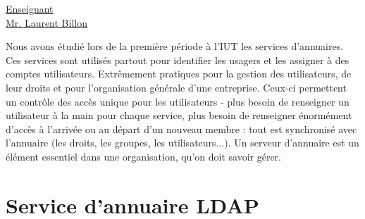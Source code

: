 \renewcommand{\figurename}{}

\vspace*{0.2cm}%
      \large
      \href{\@orientadorPagina}{\color{black}Enseignant\\Mr. Laurent Billon}\\%
\vspace*{0.5cm}%

Nous avons étudié lors de la première période à l'IUT les services d'annuaires. Ces services sont utilisés partout pour identifier les usagers et les assigner à des comptes utilisateurs. Extrêmement pratiques pour la gestion des utilisateurs, de leur droits et pour l'organisation générale d'une entreprise. Ceux-ci permettent un contrôle des accès unique pour les utilisateurs - plus besoin de renseigner un utilisateur à la main pour chaque service, plus besoin de renseigner énormément d'accès à l'arrivée ou au départ d'un nouveau membre : tout est synchronisé avec l'annuaire (les droits, les groupes, les utilisateurs...). Un serveur d'annuaire est un élément essentiel dans une organisation, qu'on doit savoir gérer. 

\section{Service d'annuaire LDAP}


